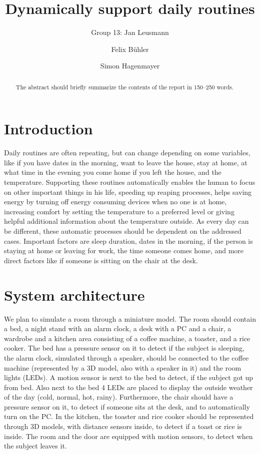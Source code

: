 \documentclass[runningheads]{llncs}
\begin{document}
%
\title{Dynamically support daily routines}

\author{Group 13: Jan Leusmann\and
Felix B\"uhler \and
Simon Hagenmayer}

%
\maketitle              %
%
\begin{abstract}
The abstract should briefly summarize the contents of the report in
150--250 words.

\end{abstract}
%
%
%
\section{Introduction}
Daily routines are often repeating, but can change depending on some variables, like if you have dates in the morning, want to leave the house, stay at home, at what time in the evening you come home if you left the house, and the temperature. 
Supporting these routines automatically enables the human to focus on other important things in his life, speeding up reaping processes, helps saving energy by turning off energy consuming devices when no one is at home, increasing comfort by setting the temperature to a preferred level or giving helpful additional information about the temperature outside.
As every day can be different, these automatic processes should be dependent on the addressed cases. 
Important factors are sleep duration, dates in the morning, if the person is staying at home or leaving for work, the time someone comes home, and more direct factors like if someone is sitting on the chair at the desk.




\section{System architecture}
We plan to simulate a room through a miniature model.
The room should contain a bed, a night stand with an alarm clock, a desk with a PC and a chair, a wardrobe and a kitchen area consisting of a coffee machine, a toaster, and a rice cooker.
The bed has a pressure sensor on it to detect if the subject is sleeping, the alarm clock, simulated through a speaker, should be connected to the coffee machine (represented by a 3D model, also with a speaker in it) and the room lights (LEDs).
A motion sensor is next to the bed to detect, if the subject got up from bed.
Also next to the bed 4 LEDs are placed to display the outside weather of the day (cold, normal, hot, rainy). 
Furthermore, the chair should have a pressure sensor on it, to detect if someone sits at the desk, and to automatically turn on the PC.
In the kitchen, the toaster and rice cooker should be represented through 3D models, with distance sensors inside, to detect if a toast or rice is inside. 
The room and the door are equipped with motion sensors, to detect when the subject leaves it.
\end{document}
